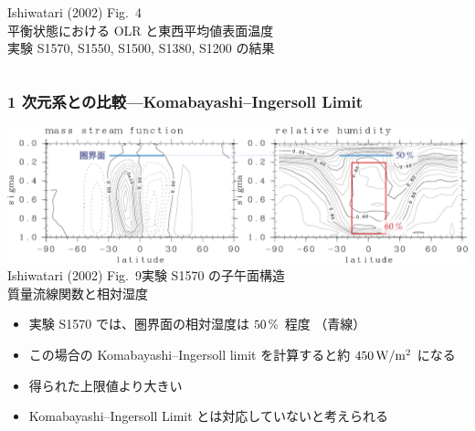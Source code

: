 \documentclass[aspectratio=149,9pt,fleqn]{beamer}
\begin{document}
\begin{frame}
\begin{columns}[T,onlytextwidth]
\begin{column}{.4\textwidth}
			\scriptsize Ishiwatari \etal (2002) Fig.\ 4\\
			平衡状態における OLR と東西平均値表面温度\\
			実験 S1570, S1550, S1500, S1380, S1200 の結果
		\end{column}
	\end{columns}
\end{frame}

\begin{frame}
	\frametitle{1 次元系との比較---Komabayashi--Ingersoll Limit}
	\begin{center}
		\includegraphics[width=.9\textwidth]{zu-crop.pdf}\\
			\scriptsize Ishiwatari \etal (2002) Fig.\ 9\quad 実験 S1570 の子午面構造\\
			質量流線関数と相対湿度
	\end{center}
	\begin{itemize}
		\item 実験 S1570 では、圏界面の相対湿度は \(50\hmu{\%}\) 程度
			\textcolor[cmyk]{1,1,0,0}{（青線）}
		\item この場合の Komabayashi--Ingersoll limit を計算すると約 \(450\hmu{W/m^2}\) になる
		\item 得られた上限値より大きい
		\item Komabayashi--Ingersoll Limit とは対応していないと考えられる
	\end{itemize}
\end{frame}
\end{document}
